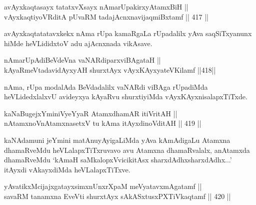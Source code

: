 \begin{shl}
avAyxkaqtasayx tatatxvXsayx nAmarUpakirxyAtamxBiH || \\
vAyxkaqtiyoVRditA pUvaRM tadajAcnxnavijaqmiBxtamf \hfill || 417 ||  
\end{shl}

\begin{artha}
avAyxkaqtatatavxkekx nAma rUpa kamaRgaLa rUpadalilx yAva saqSiTxyanunx
hiMde heVLididxtoV adu ajAcnxnada vikAsave.
\end{artha}


\begin{shl}
nAmarUpAdiBeVdeVna vaNARdiparxviBAgataH || \\
kAyaRmeVtadavidAyxyAH shurxtAyx vAyxKAyxyateV\s Kilamf \hfill ||418||  
\end{shl}

\begin{artha}
nAma, rUpa modalAda BeVdadalilx vaNARdi viBAga rUpadiMda
heVLidedxlalxvU avideyxya kAyaRvu shurxtiyiMda vAyxKAyxnisalapxTiTxde.
\end{artha}


\begin{shl}
kaNaBugejxYminiVyeYyaR AtamxdhamAR itiVritAH || \\
nA\s \s tamxnoV\s nAtamxnasetxV tu kAma itAyxdinoVditAH \hfill || 419 || 
\end{shl}

\begin{artha}
kaNAdamuni jeYmini matAnuyAyigaLiMda yAva kAmAdigaLu Atamxna
dhamaRveMdu heVLalapxTiTxruvavo avu Atamxna dhamaRvalalx,
anAtamxda dhamaRveMdu `kAmaH saMkalopxVvicikitAsx sharxdAdhx\s sharxdAdhx...' itAyxdi vAkayxdiMda heVLalapxTiTxve.
\end{artha}



\begin{shl}
yAvatikxMcijajxgatayxsimxnUnxrXpaM meVyatavxmAgatamf || \\
savaRM tanamxna EveVti shurxtAyx sAkASxtusxPXTiVkaqtamf \hfill || 420 ||  
\end{shl}

